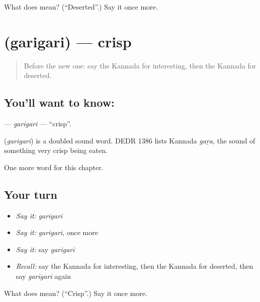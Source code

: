 \begin{tcolorbox}[breakable,colback=teal!4,colframe=teal!35!black,title={Before you move on}]
What does  mean? (\textquotedblleft{}Deserted\textquotedblright{}.) Say it once more.
\end{tcolorbox}
\section[\texorpdfstring{\kn{ಗರಿಗರಿ} (garigari)}{ಗರಿಗರಿ (garigari)}]{ (garigari) — crisp}

\label{lesson:KA-C292-garigari}



\begin{quote}
Before the new one: say the Kannada for interesting, then the Kannada for deserted.
\end{quote}

\subsection*{You'll want to know: }
\textbf{} — \emph{garigari} — \textquotedblleft{}crisp\textquotedblright{}.

\begin{cousinweb}
\textbf{} (\emph{garigari}) is a doubled sound word. DEDR 1386 lists Kannada \emph{gaṟa}, the sound of something very crisp being eaten.
\end{cousinweb}

\begin{grammarlens}[title={What you've built}]
One more word for this chapter.
\end{grammarlens}

\subsection*{Your turn}
\begin{itemize}
\raggedright
  \item \emph{Say it:} \emph{garigari}
  \item \emph{Say it:} \emph{garigari}, once more
  \item \emph{Say it:} say \emph{garigari}
  \item \emph{Recall:} say the Kannada for interesting, then the Kannada for deserted, then say \emph{garigari} again
\end{itemize}

\begin{tcolorbox}[breakable,colback=teal!4,colframe=teal!35!black,title={Before you move on}]
What does  mean? (\textquotedblleft{}Crisp\textquotedblright{}.) Say it once more.
\end{tcolorbox}
